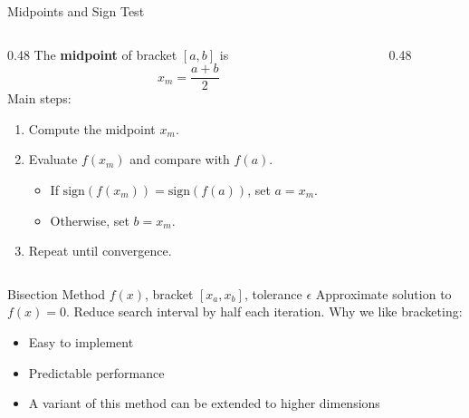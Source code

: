 \documentclass[10pt]{beamer}
\begin{document}
\begin{frame}{Midpoints and Sign Test}
\begin{columns}
  \begin{column}{0.48\textwidth}
The \textbf{midpoint} of bracket \([a,b]\) is
\begin{equation*}
    x_m = \frac{a+b}{2}
\end{equation*}
Main steps:
\begin{enumerate}
    \item Compute the midpoint $x_m$.
    \item Evaluate \(f(x_m)\) and compare with \(f(a)\).
    \begin{itemize}
        \item If \(\mathrm{sign}(f(x_m)) = \mathrm{sign}(f(a))\), set \(a = x_m\).
        \item Otherwise, set \(b = x_m\).
    \end{itemize}
    \item Repeat until convergence.
\end{enumerate}
  \end{column}
  \begin{column}{0.48\textwidth}
  \end{column}
\end{columns}
\end{frame}
\begin{frame}{Bisection Method}
{ $f(x)$, bracket $[x_a, x_b]$, tolerance $\epsilon$ }
{Approximate solution to $f(x)=0$.}
{Reduce search interval by half each iteration.}
\vspace{5mm}
Why we like bracketing:
\begin{itemize}
    \item Easy to implement
    \item Predictable performance 
    \item A variant of this method can be extended to higher dimensions
\end{itemize}
\end{frame}
\end{document}

